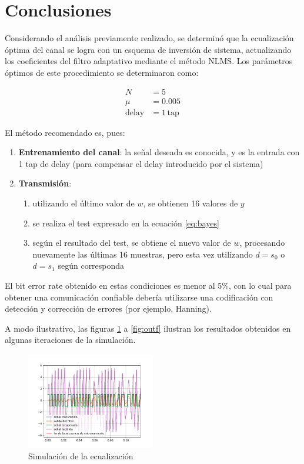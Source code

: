 \documentclass[main.tex]{subfiles}
\begin{document}
\section{Conclusiones}

Considerando el an\'alisis previamente realizado, se determin\'o que la ecualizaci\'on \'optima del canal se logra con un esquema de inversi\'on de sistema, actualizando los coeficientes del filtro adaptativo mediante el m\'etodo NLMS. Los par\'ametros \'optimos de este procedimiento se determinaron como:

\begin{equation}
\begin{aligned}
	N &= 5 \\
	\mu &= 0.005 \\
	\text{delay} &= 1\, \text{tap}
\end{aligned}
\end{equation}

El m\'etodo recomendado es, pues:

\begin{enumerate}
	\item \textbf{Entrenamiento del canal}: la se\~nal deseada es conocida, y es la entrada
	con 1 tap de delay (para compensar el delay introducido por el sistema) 
	\item \textbf{Transmisi\'on}: 
	\begin{enumerate}
		\item utilizando el \'ultimo valor de $w$, se obtienen 16 valores de $y$
		\item se realiza el test expresado en la ecuaci\'on \ref{eq:bayes}
		\item seg\'un el resultado del test, se obtiene el nuevo valor de $w$, procesando
		nuevamente las \'ultimas 16 muestras, pero esta vez utilizando $d=s_0$ o $d=s_1$
		seg\'un corresponda
	\end{enumerate} 
\end{enumerate}

El bit error rate obtenido en estas condiciones es menor al 5\%, con lo cual para obtener una comunicaci\'on confiable deber\'ia utilizarse una codificaci\'on con detecci\'on y correcci\'on de errores (por ejemplo, Hanning).

A modo ilustrativo, las figuras \ref{fig:out0} a \ref{fig:outf} ilustran los resultados obtenidos en algunas iteraciones de la simulaci\'on.

\begin{figure}[hp]
	\centering
	\includegraphics[width=0.5\textwidth]{imagenes/out1.png}
	\caption{Simulaci\'on de la ecualizaci\'on}
	\label{fig:out0}
\end{figure}
\end{document}
